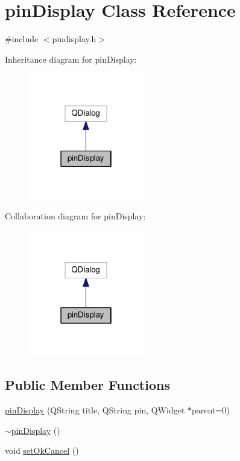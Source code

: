 \hypertarget{classpinDisplay}{}\section{pin\+Display Class Reference}
\label{classpinDisplay}


{\ttfamily \#include $<$pindisplay.\+h$>$}



Inheritance diagram for pin\+Display\+:\nopagebreak
\begin{figure}[H]
\begin{center}
\leavevmode
\includegraphics[width=142pt]{classpinDisplay__inherit__graph}
\end{center}
\end{figure}


Collaboration diagram for pin\+Display\+:\nopagebreak
\begin{figure}[H]
\begin{center}
\leavevmode
\includegraphics[width=142pt]{classpinDisplay__coll__graph}
\end{center}
\end{figure}
\subsection*{Public Member Functions}
\begin{DoxyCompactItemize}
\item 
\hyperlink{classpinDisplay_a36cbc413bef6dbb2b35d22034e09d954}{pin\+Display} (Q\+String title, Q\+String pin, Q\+Widget $\ast$parent=0)
\item 
\hyperlink{classpinDisplay_a9f0d6882b7e823bf510390701f5e2f85}{$\sim$pin\+Display} ()
\item 
void \hyperlink{classpinDisplay_a1a00155d5f7c1e3c1c7512cf5a2670af}{set\+Ok\+Cancel} ()
\end{DoxyCompactItemize}


